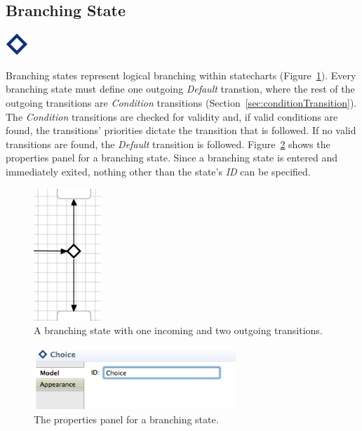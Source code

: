 \documentclass[11pt]{amsart}
\begin{document}
\clearpage

\subsection{Branching State}
\label{sec:branchingState}
\includegraphics[height=.2in]{StatechartsImages/Choice-32.png}

Branching states represent logical branching within statecharts (Figure~\ref{fig:branching}). Every branching state must define one outgoing \emph{Default} transtion, where the rest of the outgoing transitions are \emph{Condition} transitions (Section~\ref{sec:conditionTransition}). The \emph{Condition} transitions are checked for validity and, if valid conditions are found, the transitions' priorities dictate the transition that is followed. If no valid transitions are found, the \emph{Default} transition is followed. Figure~\ref{fig:branchingProperties} shows the properties panel for a branching state. Since a branching state is entered and immediately exited, nothing other than the state's \emph{ID} can be specified.

\begin{figure}
\begin{center}
\vspace{.2in}
\centerline {
\includegraphics[width=1in]{StatechartsImages/Branching.png}
}
\caption{A branching state with one incoming and two outgoing transitions.}
\label{fig:branching}
\end{center}
\end{figure}

\begin{figure}
\begin{center}
\vspace{.2in}
\centerline {
\includegraphics[width=3in]{StatechartsImages/BranchingProperties.png}
}
\caption{The properties panel for a branching state.}
\label{fig:branchingProperties}
\end{center}
\end{figure}
\end{document}
